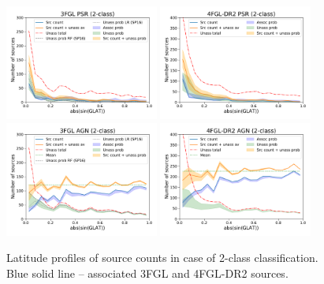 \documentclass{aa}
\begin{document}
\begin{figure}[h]
\centering
\includegraphics[width=0.45\textwidth]{plots/lat_profile_PSR_3FGL_2classes.pdf}
\includegraphics[width=0.45\textwidth]{plots/lat_profile_PSR_4FGL-DR2_2classes.pdf} \\
\includegraphics[width=0.45\textwidth]{plots/lat_profile_AGN_3FGL_2classes.pdf}
\includegraphics[width=0.45\textwidth]{plots/lat_profile_AGN_4FGL-DR2_2classes.pdf}
\caption{Latitude profiles of source counts in case of 2-class classification. 
Blue solid line -- associated 3FGL and 4FGL-DR2  sources. 
}
\end{figure}
\end{document}
